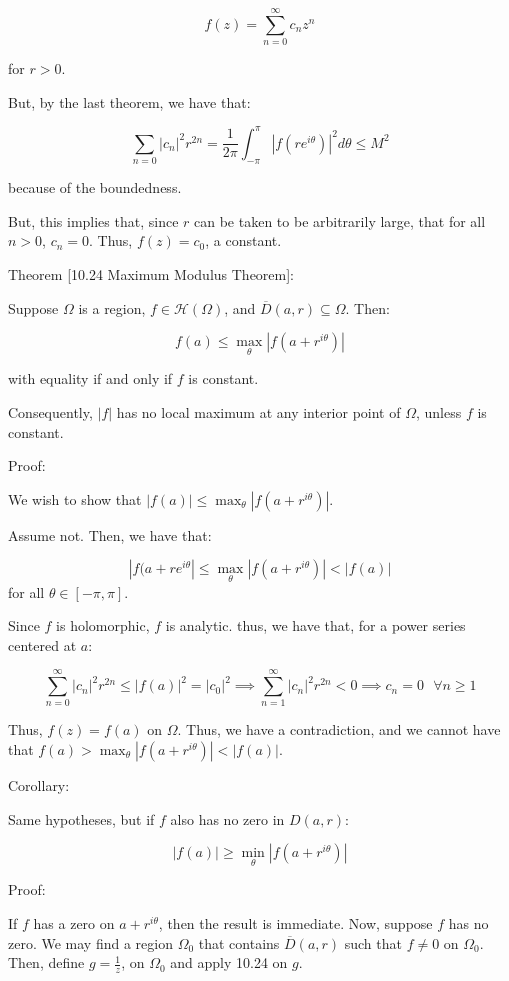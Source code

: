 \documentclass[10pt]{article}
\newcommand{\calH}{\mathcal{H}}
\begin{document}
$$f(z) = \sum_{n=0}^\infty c_n z^n$$

for $r > 0$.

But, by the last theorem, we have that:

$$\sum_{n=0} |c_n|^2 r^{2n} = \frac{1}{2\pi} \int_{-\pi}^\pi |f(re^{i\theta})|^2 d\theta \leq M^2 $$

because of the boundedness.

But, this implies that, since $r$ can be taken to be arbitrarily large, that for all $n > 0$, $c_n = 0$. Thus, $f(z) = c_0$, a constant.

Theorem [10.24 Maximum Modulus Theorem]:

Suppose $\Omega$ is a region, $f \in \calH(\Omega)$, and $\overline{D}(a,r) \subseteq \Omega$. Then:

$$f(a) \leq \max_{\theta} | f(a + r^{i\theta})|$$

with equality if and only if $f$ is constant.

Consequently, $|f|$ has no local maximum at any interior point of $\Omega$, unless $f$ is constant.

Proof:

We wish to show that $|f(a)| \leq \max_{\theta} | f(a + r^{i\theta})|$.

Assume not. Then, we have that:

$$|f(a + r e^{i\theta}| \leq \max_{\theta} | f(a + r^{i\theta})| < |f(a)|$$ for all $\theta \in [-\pi,\pi]$.

Since $f$ is holomorphic, $f$ is analytic. thus, we have that, for a power series centered at $a$:

$$\sum_{n=0}^\infty |c_n|^2 r^{2n} \leq |f(a)|^2 = |c_0|^2  \implies \sum_{n=1}^\infty |c_n|^2 r^{2n} < 0 \implies c_n = 0 \text{  }\forall n \geq 1$$

Thus, $f(z) = f(a)$ on $\Omega$. Thus, we have a contradiction, and we cannot have that $f(a) > \max_{\theta} | f(a + r^{i\theta})| < |f(a)|$.

Corollary:

Same hypotheses, but if $f$ also has no zero in $D(a,r)$:

$$|f(a)| \geq \min_{\theta} | f(a + r^{i\theta})|$$

Proof:

If $f$ has a zero on $a + r^{i\theta}$, then the result is immediate. Now, suppose $f$ has no zero. We may find a region $\Omega_0$ that contains $\overline{D}(a,r)$ such that $f \not = 0$ on $\Omega_0$. Then, define $g = \frac{1}{z}$, on $\Omega_0$ and apply 10.24 on $g$.
\end{document}
